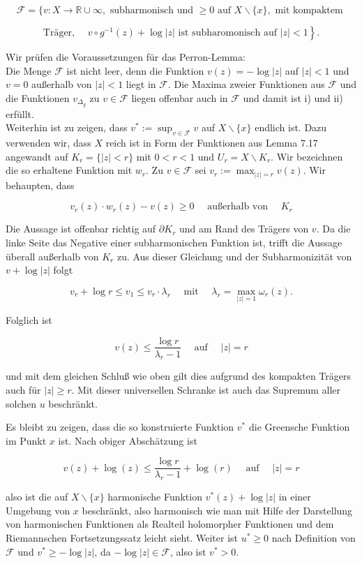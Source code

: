 \documentclass[10pt, letterpaper]{article}
\begin{document}
$$
\mathcal{F}=\{v: X \rightarrow \mathbb{R} \cup \infty, \text { subharmonisch und } \geqslant 0 \text { auf } X \backslash\{x\}, \text { mit kompaktem }
$$

$$
\text { Träger, } \left.\quad v \circ g^{-1}(z)+\log |z| \text { ist subharomonisch auf }|z|<1\right\} \text {. }
$$

Wir prüfen die Voraussetzungen für das Perron-Lemma:\\
Die Menge $\mathcal{F}$ ist nicht leer, denn die Funktion $v(z)=-\log |z|$ auf $|z|<1$ und $v=0$ außerhalb von $|z|<1$ liegt in $\mathcal{F}$. Die Maxima zweier Funktionen aus $\mathcal{F}$ und die Funktionen $v_{\Delta_{g}}$ zu $v \in \mathcal{F}$ liegen offenbar auch in $\mathcal{F}$ und damit ist i) und ii) erfüllt.\\
Weiterhin ist zu zeigen, dass $v^{*}:=\sup _{v \in \mathcal{F}} v$ auf $X \backslash\{x\}$ endlich ist. Dazu verwenden wir, dass $X$ reich ist in Form der Funktionen aus Lemma 7.17 angewandt auf $K_{r}=\{|z|<r\}$ mit $0<r<1$ und $U_{r}=X \backslash K_{r}$. Wir bezeichnen die so erhaltene Funktion mit $w_{r}$. Zu $v \in \mathcal{F}$ sei $v_{r}:=\max _{|z|=r} v(z)$. Wir behaupten, dass

$$
v_{r}(z) \cdot w_{r}(z)-v(z) \geqslant 0 \quad \text { außerhalb von } \quad K_{r}
$$

Die Aussage ist offenbar richtig auf $\partial K_{r}$ und am Rand des Trägers von $v$. Da die linke Seite das Negative einer subharmonischen Funktion ist, trifft die Aussage überall außerhalb von $K_{r}$ zu. Aus dieser Gleichung und der Subharmonizität von $v+\log |z|$ folgt

$$
v_{r}+\log r \leq v_{1} \leq v_{r} \cdot \lambda_{r} \quad \text { mit } \quad \lambda_{r}=\max _{|z|=1} \omega_{r}(z) .
$$

Folglich ist

$$
v(z) \leq \frac{\log r}{\lambda_{r}-1} \quad \text { auf } \quad|z|=r
$$

und mit dem gleichen Schluß wie oben gilt dies aufgrund des kompakten Trägers auch für $|z| \geqslant r$. Mit dieser universellen Schranke ist auch das Supremum aller solchen $u$ beschränkt.

Es bleibt zu zeigen, dass die so konstruierte Funktion $v^{*}$ die Greensche Funktion im Punkt $x$ ist. Nach obiger Abschätzung ist

$$
v(z)+\log (z) \leq \frac{\log r}{\lambda_{r}-1}+\log (r) \quad \text { auf } \quad|z|=r
$$

also ist die auf $X \backslash\{x\}$ harmonische Funktion $v^{*}(z)+\log |z|$ in einer Umgebung von $x$ beschränkt, also harmonisch wie man mit Hilfe der Darstellung von harmonischen Funktionen als Realteil holomorpher Funktionen und dem Riemannschen Fortsetzungssatz leicht sieht. Weiter ist $u^{*} \geqslant 0$ nach Definition von $\mathcal{F}$ und $v^{*} \geqslant-\log |z|$, da $-\log |z| \in \mathcal{F}$, also ist $v^{*}>0$.
\end{document}
